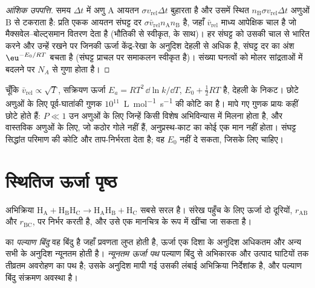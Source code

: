 \begin{proof}[आंशिक उपपत्ति]
समय $\Delta t$ में अणु A आयतन $\sigma v_{\mathrm{rel}}\Delta t$ बुहारता है और उसमें स्थित
$n_{\mathrm B}\sigma v_{\mathrm{rel}}\Delta t$ अणुओं B से टकराता है: प्रति एकक आयतन संघट्ट दर
$\sigma\bar v_{\mathrm{rel}}n_{\mathrm A}n_{\mathrm B}$ है, जहाँ $\bar v_{\mathrm{rel}}$ माध्य आपेक्षिक चाल है जो
मैक्सवेल--बोल्ट्समान वितरण देता है (भौतिकी से स्वीकृत,  के साथ)। हर संघट्ट को उसकी चाल से भारित करने और उन्हें रखने पर जिनकी ऊर्जा
केंद्र-रेखा के अनुदिश देहली से अधिक है, संघट्ट दर का अंश
$\eu^{-E_0/RT}$ बचता है (संघट्ट प्राचल पर समाकलन
स्वीकृत है)। संख्या घनत्वों को मोलर सांद्रताओं में बदलने पर
$N_A$ से गुणा होता है।
\end{proof}

चूँकि $\bar v_{\mathrm{rel}} \propto \sqrt T$, सक्रियण ऊर्जा $E_a = RT^2\,\dd\ln k/\dd T$, $E_0 + \frac12RT$ है,
देहली के निकट। छोटे अणुओं के लिए पूर्व-घातांकी गुणक
$10^{11}$~\unit{L.mol^{-1}.s^{-1}} की कोटि का है। मापे गए गुणक प्रायः
कहीं छोटे होते हैं: $P \ll 1$ उन अणुओं के लिए जिन्हें किसी विशेष
अभिविन्यास में मिलना होता है, और वास्तविक अणुओं के लिए, जो कठोर गोले नहीं हैं,
अनुप्रस्थ-काट का कोई एक मान नहीं होता। संघट्ट सिद्धांत परिमाण की कोटि और
ताप-निर्भरता देता है; वह $E_0$ नहीं दे सकता, जिसके लिए  चाहिए।

\section{स्थितिज ऊर्जा पृष्ठ}

अभिक्रिया $\mathrm{H_A + H_BH_C \to H_AH_B + H_C}$ सबसे सरल है। संरेख
पहुँच के लिए ऊर्जा दो दूरियों, $r_{\mathrm{AB}}$ और $r_{\mathrm{BC}}$, पर निर्भर करती है, और उसे
एक मानचित्र के रूप में खींचा जा सकता है।

\begin{definition}[पल्याण बिंदु, न्यूनतम ऊर्जा पथ]\label{def:b3:rate-theories:saddle}
 का \emph{पल्याण बिंदु} वह बिंदु है
जहाँ प्रवणता लुप्त होती है, ऊर्जा एक दिशा के अनुदिश अधिकतम और अन्य सभी के अनुदिश
न्यूनतम होती है। \emph{न्यूनतम ऊर्जा पथ}
पल्याण बिंदु से अभिकारक और उत्पाद घाटियों तक तीव्रतम अवरोहण का पथ है;
उसके अनुदिश मापी गई उसकी लंबाई अभिक्रिया निर्देशांक है,
और पल्याण बिंदु संक्रमण अवस्था है।
\end{definition}


